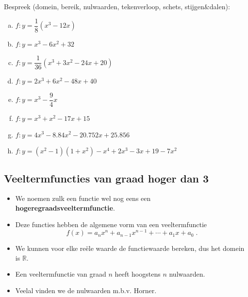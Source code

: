 \documentclass[12pt,twoside,a4paper]{article}
\begin{document}
\begin{oefening}
Bespreek (domein, bereik, nulwaarden, tekenverloop, schets, stijgen\&dalen):
\begin{multicols}{2}
\begin{enumerate}[(a)]
  \itemsep.8em
  \item $f:y=\dfrac{1}{8}(x^3-12x)$
  \item $f:y=x^3-6x^2+32$
  \item $f:y=\dfrac{1}{36}(x^3+3x^2-24x+20)$
  \item $f:y=2x^3+6x^2-48x+40$
  \item $f:y=x^3-\dfrac{9}{4}x$
  \item $f:y=x^3+x^2-17x+15$
  \item $f:y=4x^3-8.84x^2-20.752x+25.856$
  \item $f:y=(x^2-1)(1+x^2)-x^4+2x^3-3x+19-7x^2$
\end{enumerate}
\end{multicols}
\end{oefening}

\subsection{Veeltermfuncties van graad hoger dan 3}

\begin{itemize}
\item We noemen zulk een functie wel nog eens een {\bf hogeregraadsveeltermfunctie}.
\item Deze functies hebben de algemene vorm van een veeltermfunctie
  $$f(x)= a_nx^n + a_{n-1}x^{n-1} + \cdots + a_1x + a_0\;.$$
\item We kunnen voor elke reële waarde de functiewaarde bereken, dus het domein is $\mathbb{R}$.
\item Een veeltermfunctie van graad $n$ heeft hoogstens $n$ nulwaarden.
\item Veelal vinden we de nulwaarden m.b.v. Horner.
\end{itemize}

\needspace{2cm}
\end{document}
